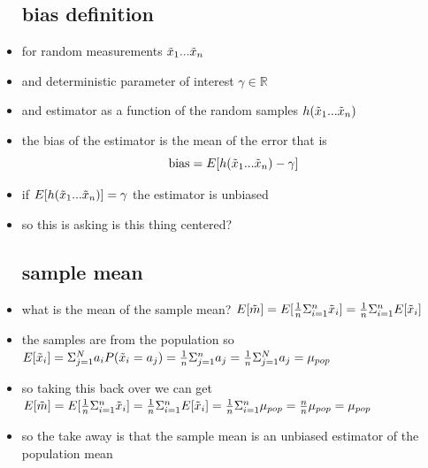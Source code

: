 \documentclass{article}
\begin{document}
\begin{itemize}
\subsection{bias definition}
\item for random measurements $\Tilde{x}_1...\Tilde{x}_n$ 
\item and deterministic parameter of interest $\gamma \in \mathbb{R}$
\item and estimator as a function of the random samples $h(\Tilde{x}_1...\Tilde{x}_n)$ 
\item the bias of the estimator is the mean of the error that is $$\text{bias}=E[h(\Tilde{x}_1...\Tilde{x}_n) -\gamma]$$
\item if $E[h(\Tilde{x}_1...\Tilde{x}_n)]=\gamma$ the estimator is unbiased
\item so this is asking is this thing centered?
\subsection{sample mean}
\item what is the mean of the sample mean? $E[\Tilde{m}]=E[\frac{1}{n}\Sigma_{i=1}^{n}\Tilde{x}_{i}]=\frac{1}{n}\Sigma_{i=1}^{n}E[\Tilde{x}_i]$
\item the samples are from the population so $E[\Tilde{x}_i]=\Sigma_{j=1}^{N}a_iP(\Tilde{x}_i=a_{j})=\frac{1}{n}\Sigma_{j=1}^{n}a_j=\frac{1}{n}\Sigma_{j=1}^{N}a_j=\mu_{pop}$
\item so taking this back over we can get $E[\Tilde{m}]=E[\frac{1}{n}\Sigma_{i=1}^{n}\Tilde{x}_{i}]=\frac{1}{n}\Sigma_{i=1}^{n}E[\Tilde{x}_i]=\frac{1}{n}\Sigma_{i=1}^{n}\mu_{pop}=\frac{n}{n}\mu_{pop}=\mu_{pop}$
\item so the take away is that the sample mean is an unbiased estimator of the population mean 

\end{itemize}
\end{document}
